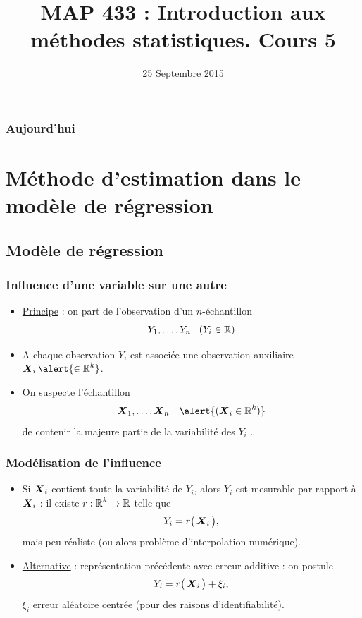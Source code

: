 


\title{MAP 433 : Introduction aux méthodes statistiques. Cours 5}

\date{25 Septembre 2015}
\maketitle



\begin{frame}
\frametitle{Aujourd'hui}
\tableofcontents
\end{frame}


\section{Méthode d'estimation dans le modèle de régression}

\subsection{Modèle de régression}

\begin{frame}
\frametitle{Influence d'une variable sur une autre}
\begin{itemize}
\item \underline{Principe} : on part de \alert{l'observation} d'un $n$-échantillon
$$Y_1,\ldots, Y_n\;\;\;(Y_i \in \operatorname{{\mathbb R}})$$
\item A chaque observation $Y_i$ est associée une \alert{observation auxiliaire} $\bX_i \alert{ \in \R^k}$.
\item On \alert{suspecte} l'échantillon
$$\bX_1,\ldots, \bX_n\;\;\;\alert{ (\bX_i \in \R^k)}$$
de contenir la \og majeure partie de la variabilité des $Y_i$ \fg{}.
\end{itemize}
\end{frame}

\begin{frame}
\frametitle{Modélisation de l'influence}
\begin{itemize}
\item Si $\operatorname{\boldsymbol{X}}_i$ contient \alert{toute la variabilité} de $Y_i$, alors $Y_i$ est mesurable par rapport à $\operatorname{\boldsymbol{X}}_i$ : il existe $r:\operatorname{{\mathbb R}}^k\rightarrow \operatorname{{\mathbb R}}$ telle que
$$Y_i = r\big(\operatorname{\boldsymbol{X}}_i\big),$$
mais peu réaliste (ou alors \alert{problème d'interpolation
numérique}).
\item \underline{Alternative} : représentation précédente avec \alert{ erreur additive} : on \alert{ postule}
$$Y_i = r\big(\operatorname{\boldsymbol{X}}_i\big)+\xi_i,$$
$\xi_i$ erreur aléatoire centrée (pour des raisons d'identifiabilité).
\end{itemize}
\end{frame}


